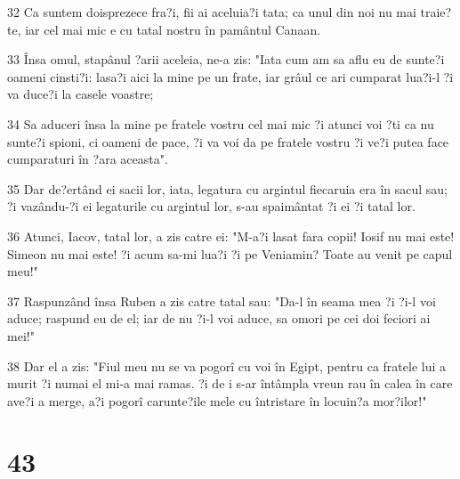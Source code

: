 \par 32 Ca suntem doisprezece fra?i, fii ai aceluia?i tata; ca unul din noi nu mai traie?te, iar cel mai mic e cu tatal nostru în pamântul Canaan.
\par 33 Însa omul, stapânul ?arii aceleia, ne-a zis: "Iata cum am sa aflu eu de sunte?i oameni cinsti?i: lasa?i aici la mine pe un frate, iar grâul ce ari cumparat lua?i-l ?i va duce?i la casele voastre;
\par 34 Sa aduceri însa la mine pe fratele vostru cel mai mic ?i atunci voi ?ti ca nu sunte?i spioni, ci oameni de pace, ?i va voi da pe fratele vostru ?i ve?i putea face cumparaturi în ?ara aceasta".
\par 35 Dar de?ertând ei sacii lor, iata, legatura cu argintul fiecaruia era în sacul sau; ?i vazându-?i ei legaturile cu argintul lor, s-au spaimântat ?i ei ?i tatal lor.
\par 36 Atunci, Iacov, tatal lor, a zis catre ei: "M-a?i lasat fara copii! Iosif nu mai este! Simeon nu mai este! ?i acum sa-mi lua?i ?i pe Veniamin? Toate au venit pe capul meu!"
\par 37 Raspunzând însa Ruben a zis catre tatal sau: "Da-l în seama mea ?i ?i-l voi aduce; raspund eu de el; iar de nu ?i-l voi aduce, sa omori pe cei doi feciori ai mei!"
\par 38 Dar el a zis: "Fiul meu nu se va pogorî cu voi în Egipt, pentru ca fratele lui a murit ?i numai el mi-a mai ramas. ?i de i s-ar întâmpla vreun rau în calea în care ave?i a merge, a?i pogorî carunte?ile mele cu întristare în locuin?a mor?ilor!"

\chapter{43}

